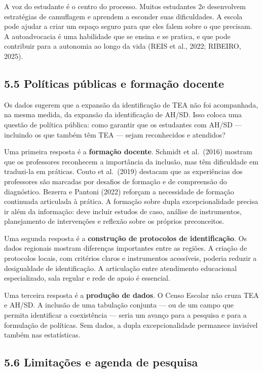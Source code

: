 A voz do estudante é o centro do processo. Muitos estudantes 2e
desenvolvem estratégias de camuflagem e aprendem a esconder suas
dificuldades. A escola pode ajudar a criar um espaço seguro para que
eles falem sobre o que precisam. A autoadvocacia é uma habilidade que se
ensina e se pratica, e que pode contribuir para a autonomia ao longo da
vida (REIS et al., 2022; RIBEIRO, 2025).

\subsection{5.5 Políticas públicas e formação
docente}\label{poluxedticas-puxfablicas-e-formauxe7uxe3o-docente}

Os dados sugerem que a expansão da identificação de TEA não foi
acompanhada, na mesma medida, da expansão da identificação de AH/SD.
Isso coloca uma questão de política pública: como garantir que os
estudantes com AH/SD --- incluindo os que também têm TEA --- sejam
reconhecidos e atendidos?

Uma primeira resposta é a \textbf{formação docente}. Schmidt et
al.~(2016) mostram que os professores reconhecem a importância da
inclusão, mas têm dificuldade em traduzi-la em práticas. Couto et
al.~(2019) destacam que as experiências dos professores são marcadas por
desafios de formação e de compreensão do diagnóstico. Bezerra e Pantoni
(2022) reforçam a necessidade de formação continuada articulada à
prática. A formação sobre dupla excepcionalidade precisa ir além da
informação: deve incluir estudos de caso, análise de instrumentos,
planejamento de intervenções e reflexão sobre os próprios preconceitos.

Uma segunda resposta é a \textbf{construção de protocolos de
identificação}. Os dados regionais mostram diferenças importantes entre
as regiões. A criação de protocolos locais, com critérios claros e
instrumentos acessíveis, poderia reduzir a desigualdade de
identificação. A articulação entre atendimento educacional
especializado, sala regular e rede de apoio é essencial.

Uma terceira resposta é a \textbf{produção de dados}. O Censo Escolar
não cruza TEA e AH/SD. A inclusão de uma tabulação conjunta --- ou de um
campo que permita identificar a coexistência --- seria um avanço para a
pesquisa e para a formulação de políticas. Sem dados, a dupla
excepcionalidade permanece invisível também nas estatísticas.

\subsection{5.6 Limitações e agenda de
pesquisa}\label{limitauxe7uxf5es-e-agenda-de-pesquisa}

